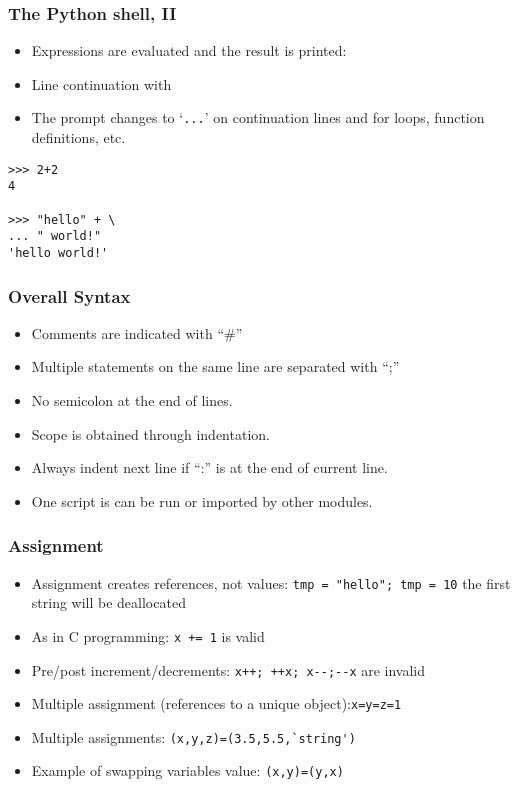 \begin{frame}[fragile]\frametitle{The Python shell, II}
\begin{itemize}
\item Expressions are evaluated and the result is printed:
\item Line continuation with \\ 
\item The prompt changes to `\texttt{...}' on continuation lines and for loops, function definitions, etc.
\end{itemize}

\begin{lstlisting}
>>> 2+2
4

>>> "hello" + \
... " world!"
'hello world!'
\end{lstlisting}
\end{frame}

\begin{frame}[fragile]  \frametitle{Overall Syntax}
\begin{itemize}
\item Comments are indicated with ``\#''
\item Multiple statements on the same line are separated with ``;''
\item No semicolon at the end of lines.
\item Scope is obtained through indentation. 
\item Always indent next line if ``:'' is at the end of current line.
\item One script is can be run or imported by other modules.
\end{itemize}
\end{frame}


\begin{frame}[fragile]  \frametitle{Assignment}
\begin{itemize}
\item Assignment creates references, not values:
\lstinline{tmp = "hello"; tmp = 10}
the first string will be deallocated
\item As in C programming: \lstinline{x += 1} is valid
\item Pre/post increment/decrements: \lstinline{x++; ++x; x--;--x} are invalid
\item Multiple assignment (references to a unique object):\lstinline{x=y=z=1}
\item Multiple assignments: \lstinline{(x,y,z)=(3.5,5.5,`string')}
\item  Example of swapping variables value: \lstinline{(x,y)=(y,x)}
\end{itemize}
\end{frame}

